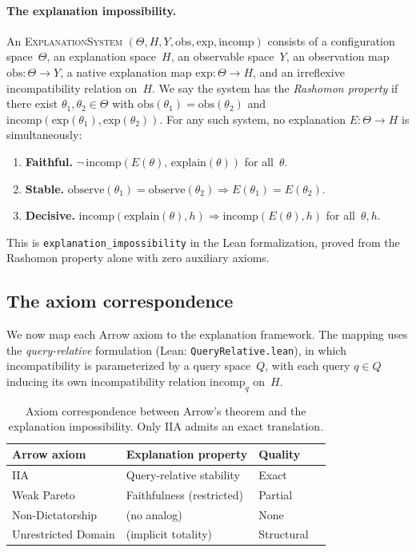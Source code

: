 \paragraph{The explanation impossibility.}
An \textsc{ExplanationSystem}
$(\Theta, H, Y, \mathrm{obs}, \mathrm{exp}, \mathrm{incomp})$
consists of a configuration space~$\Theta$, an explanation
space~$H$, an observable space~$Y$, an observation map
$\mathrm{obs} : \Theta \to Y$, a native explanation map
$\mathrm{exp} : \Theta \to H$, and an irreflexive incompatibility
relation on~$H$. We say the system has the \emph{Rashomon property}
if there exist $\theta_1, \theta_2 \in \Theta$ with
$\mathrm{obs}(\theta_1) = \mathrm{obs}(\theta_2)$ and
$\mathrm{incomp}(\mathrm{exp}(\theta_1),
\mathrm{exp}(\theta_2))$. For any such system, no explanation
$E : \Theta \to H$ is simultaneously:
\begin{enumerate}[label=\textbf{E\arabic*.},leftmargin=2.5em]
  \item \textbf{Faithful.}\;
    $\neg\,\mathrm{incomp}(E(\theta),\,\mathrm{explain}(\theta))$
    for all~$\theta$.
  \item \textbf{Stable.}\; $\mathrm{observe}(\theta_1) =
    \mathrm{observe}(\theta_2) \Rightarrow E(\theta_1) = E(\theta_2)$.
  \item \textbf{Decisive.}\;
    $\mathrm{incomp}(\mathrm{explain}(\theta), h)
    \Rightarrow \mathrm{incomp}(E(\theta), h)$ for all~$\theta, h$.
\end{enumerate}
This is \texttt{explanation\_impossibility} in the Lean formalization,
proved from the Rashomon property alone with zero auxiliary axioms.

\subsection{The axiom correspondence}
\label{sec:arrow-axiom-map}

We now map each Arrow axiom to the explanation framework. The mapping
uses the \emph{query-relative} formulation (Lean:
\texttt{QueryRelative.lean}), in which incompatibility is parameterized
by a query space~$Q$, with each query $q \in Q$ inducing its own
incompatibility relation $\mathrm{incomp}_q$ on~$H$.

\begin{table}[ht]
\centering
\renewcommand{\arraystretch}{1.3}
\begin{tabular}{@{}lllc@{}}
\toprule
\textbf{Arrow axiom} & \textbf{Explanation property} & \textbf{Quality} \\
\midrule
IIA & Query-relative stability & Exact \\
Weak Pareto & Faithfulness (restricted) & Partial \\
Non-Dictatorship & (no analog) & None \\
Unrestricted Domain & (implicit totality) & Structural \\
\bottomrule
\end{tabular}
\caption{Axiom correspondence between Arrow's theorem and the explanation
impossibility. Only IIA admits an exact translation.}
\label{tab:arrow-map}
\end{table}

